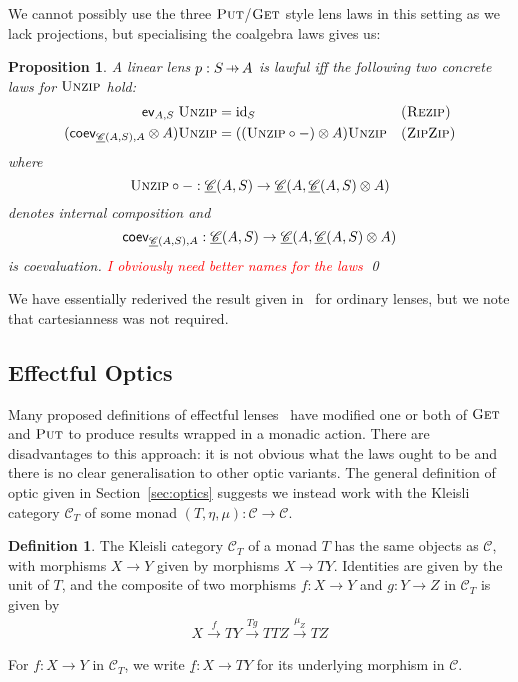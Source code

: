 \documentclass[11pt,letterpaper]{article}
\theoremstyle{plain}
\newtheorem{proposition}[theorem]{Proposition}
\theoremstyle{definition}
\newtheorem{definition}[theorem]{Definition}
\newcommand{\C}{\mathscr{C}}
\newcommand{\homC}{\underline{\C}}
\newcommand{\id}{\mathrm{id}}
\newcommand{\fget}{\textsc{Get}}
\newcommand{\fput}{\textsc{Put}}
\newcommand{\funzip}{\textsc{Unzip}}
\newcommand{\hto}{\ensuremath{\,\mathaccent\shortmid\rightarrow\,}}
\newcommand{\todo}[1]{\textcolor{red}{\small #1}}
\begin{document}
We cannot possibly use the three $\fput$/$\fget$ style lens laws in this setting as we lack projections, but specialising the coalgebra laws gives us:

\begin{proposition}\label{prop:concrete-linear-lawful}
  A linear lens $p : S \hto A$ is lawful iff the following two concrete laws for $\funzip$ hold:
  \begin{align*}
    \ev_{A, S} \; \funzip &= \id_S && \textsc{(Rezip)} \\
    (\coev_{\homC(A, S), A} \otimes A)\funzip &= ((\funzip \circ -) \otimes A)\funzip && \textsc{(ZipZip)}
  \end{align*}
  where \[ \funzip \circ - : \homC(A, S) \to \homC(A, \homC(A, S) \otimes A) \] denotes internal composition and \[\coev_{\homC(A, S), A} : \homC(A, S) \to \homC(A, \homC(A, S) \otimes A)\] is coevaluation.
  \todo{I obviously need better names for the laws} \qed
\end{proposition}

We have essentially rederived the result given in~\cite[Section 3.2]{RelatingAlgebraicAndCoalgebraic} for ordinary lenses, but we note that cartesianness was not required.

\subsection{Effectful Optics}
\newcommand{\monact}{\rtimes}

Many proposed definitions of effectful lenses~\cite{ReflectionsOnMonadicLenses} have modified one or both of $\fget$ and $\fput$ to produce results wrapped in a monadic action. There are disadvantages to this approach: it is not obvious what the laws ought to be and there is no clear generalisation to other optic variants. The general definition of optic given in Section~\ref{sec:optics} suggests we instead work with the Kleisli category $\C_T$ of some monad $(T, \eta, \mu) : \C \to \C$.

\begin{definition}
The Kleisli category $\C_T$ of a monad $T$ has the same objects as $\C$, with morphisms $X \to Y$ given by morphisms $X \to TY$. Identities are given by the unit of $T$, and the composite of two morphisms $f : X \to Y$ and $g : Y \to Z$ in $\C_T$ is given by
\begin{align*}
X \xrightarrow{f} TY \xrightarrow{Tg} TTZ \xrightarrow{\mu_Z} TZ
\end{align*}

For $f : X \to Y$ in $\C_T$, we write $\underline{f} : X \to TY$ for its underlying morphism in $\C$.
\end{definition}
\end{document}
